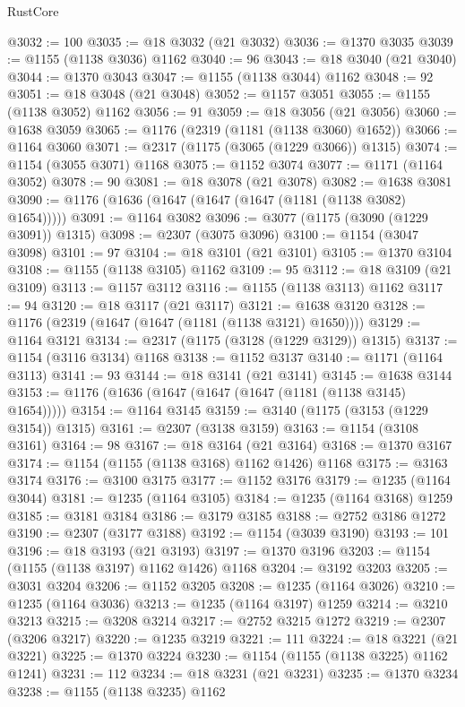 \begin{lexlean}{RustCore}
\begin{coremodule}
@3032 := 100
@3035 := @18 @3032 (@21 @3032)
@3036 := @1370 @3035
@3039 := @1155 (@1138 @3036) @1162
@3040 := 96
@3043 := @18 @3040 (@21 @3040)
@3044 := @1370 @3043
@3047 := @1155 (@1138 @3044) @1162
@3048 := 92
@3051 := @18 @3048 (@21 @3048)
@3052 := @1157 @3051
@3055 := @1155 (@1138 @3052) @1162
@3056 := 91
@3059 := @18 @3056 (@21 @3056)
@3060 := @1638 @3059
@3065 := @1176 (@2319 (@1181 (@1138 @3060) @1652))
@3066 := @1164 @3060
@3071 := @2317 (@1175 (@3065 (@1229 @3066)) @1315)
@3074 := @1154 (@3055 @3071) @1168
@3075 := @1152 @3074
@3077 := @1171 (@1164 @3052)
@3078 := 90
@3081 := @18 @3078 (@21 @3078)
@3082 := @1638 @3081
@3090 := @1176 (@1636 (@1647 (@1647 (@1647 (@1181 (@1138 @3082) @1654)))))
@3091 := @1164 @3082
@3096 := @3077 (@1175 (@3090 (@1229 @3091)) @1315)
@3098 := @2307 (@3075 @3096)
@3100 := @1154 (@3047 @3098)
@3101 := 97
@3104 := @18 @3101 (@21 @3101)
@3105 := @1370 @3104
@3108 := @1155 (@1138 @3105) @1162
@3109 := 95
@3112 := @18 @3109 (@21 @3109)
@3113 := @1157 @3112
@3116 := @1155 (@1138 @3113) @1162
@3117 := 94
@3120 := @18 @3117 (@21 @3117)
@3121 := @1638 @3120
@3128 := @1176 (@2319 (@1647 (@1647 (@1181 (@1138 @3121) @1650))))
@3129 := @1164 @3121
@3134 := @2317 (@1175 (@3128 (@1229 @3129)) @1315)
@3137 := @1154 (@3116 @3134) @1168
@3138 := @1152 @3137
@3140 := @1171 (@1164 @3113)
@3141 := 93
@3144 := @18 @3141 (@21 @3141)
@3145 := @1638 @3144
@3153 := @1176 (@1636 (@1647 (@1647 (@1647 (@1181 (@1138 @3145) @1654)))))
@3154 := @1164 @3145
@3159 := @3140 (@1175 (@3153 (@1229 @3154)) @1315)
@3161 := @2307 (@3138 @3159)
@3163 := @1154 (@3108 @3161)
@3164 := 98
@3167 := @18 @3164 (@21 @3164)
@3168 := @1370 @3167
@3174 := @1154 (@1155 (@1138 @3168) @1162 @1426) @1168
@3175 := @3163 @3174
@3176 := @3100 @3175
@3177 := @1152 @3176
@3179 := @1235 (@1164 @3044)
@3181 := @1235 (@1164 @3105)
@3184 := @1235 (@1164 @3168) @1259
@3185 := @3181 @3184
@3186 := @3179 @3185
@3188 := @2752 @3186 @1272
@3190 := @2307 (@3177 @3188)
@3192 := @1154 (@3039 @3190)
@3193 := 101
@3196 := @18 @3193 (@21 @3193)
@3197 := @1370 @3196
@3203 := @1154 (@1155 (@1138 @3197) @1162 @1426) @1168
@3204 := @3192 @3203
@3205 := @3031 @3204
@3206 := @1152 @3205
@3208 := @1235 (@1164 @3026)
@3210 := @1235 (@1164 @3036)
@3213 := @1235 (@1164 @3197) @1259
@3214 := @3210 @3213
@3215 := @3208 @3214
@3217 := @2752 @3215 @1272
@3219 := @2307 (@3206 @3217)
@3220 := @1235 @3219
@3221 := 111
@3224 := @18 @3221 (@21 @3221)
@3225 := @1370 @3224
@3230 := @1154 (@1155 (@1138 @3225) @1162 @1241)
@3231 := 112
@3234 := @18 @3231 (@21 @3231)
@3235 := @1370 @3234
@3238 := @1155 (@1138 @3235) @1162

\end{coremodule}
\end{lexlean}
